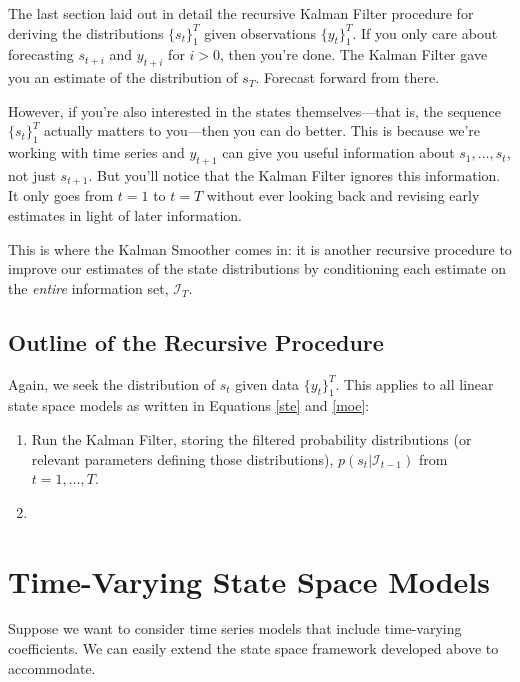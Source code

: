 \documentclass[a4paper,12pt]{article}
\begin{document}
The last section laid out in detail the recursive Kalman Filter procedure for deriving the distributions $\{s_t\}_1^T$ given observations $\{y_t\}_1^T$. If you only care about forecasting $s_{t+i}$ and $y_{t+i}$ for $i>0$, then you're done. The Kalman Filter gave you an estimate of the distribution of $s_T$. Forecast forward from there.

However, if you're also interested in the states themselves---that is, the sequence $\{s_t\}_1^T$ actually matters to you---then you can do better. This is because we're working with time series and $y_{t+1}$ can give you useful information about $s_1, \ldots, s_t$, not just $s_{t+1}$. But you'll notice that the Kalman Filter ignores this information. It only goes from $t=1$ to $t=T$ without ever looking back and revising early estimates in light of later information. 

This is where the Kalman Smoother comes in: it is another recursive procedure to improve our estimates of the state distributions by conditioning each estimate on the \emph{entire} information set, $\mathcal{I}_{T}$. 

\subsection{Outline of the Recursive Procedure}

Again, we seek the distribution of $s_t$ given data $\{y_t\}^T_1$. This applies to all linear state space models as written in Equations \ref{ste} and \ref{moe}:
\begin{enumerate}
  \item Run the Kalman Filter, storing the filtered
    probability distributions (or relevant parameters
    defining those distributions),
    $p(s_t|\mathcal{I}_{t-1})$ from $t=1,\ldots,T$.
  \item 
\end{enumerate}


\clearpage
\section{Time-Varying State Space Models}

Suppose we want to consider time series models that
include time-varying coefficients. We can easily extend
the state space framework developed above to accommodate.
\end{document}
